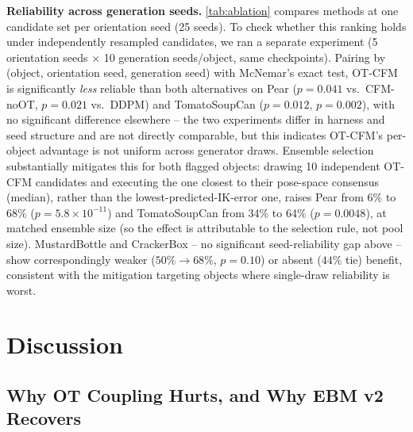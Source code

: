 \documentclass[journal]{IEEEtran}
\begin{document}
\noindent\textbf{Reliability across generation seeds.}
\cref{tab:ablation} compares methods at one candidate set per orientation
seed (25 seeds). To check whether this ranking holds under independently
resampled candidates, we ran a separate experiment (5 orientation seeds
$\times$ 10 generation seeds/object, same checkpoints). Pairing by (object,
orientation seed, generation seed) with McNemar's exact test, OT-CFM is
significantly \emph{less} reliable than both alternatives on Pear
($p{=}0.041$ vs.\ CFM-noOT, $p{=}0.021$ vs.\ DDPM) and TomatoSoupCan
($p{=}0.012$, $p{=}0.002$), with no significant difference elsewhere -- the
two experiments differ in harness and seed structure and are not directly
comparable, but this indicates OT-CFM's per-object advantage is not uniform
across generator draws. Ensemble selection substantially mitigates this for
both flagged objects: drawing 10 independent OT-CFM candidates and
executing the one closest to their pose-space consensus (median), rather
than the lowest-predicted-IK-error one, raises Pear from 6\% to 68\%
($p{=}5.8{\times}10^{-11}$) and TomatoSoupCan from 34\% to 64\%
($p{=}0.0048$), at matched ensemble size (so the effect is attributable to
the selection rule, not pool size). MustardBottle and CrackerBox -- no
significant seed-reliability gap above -- show correspondingly weaker
($50\%{\to}68\%$, $p{=}0.10$) or absent ($44\%$ tie) benefit, consistent
with the mitigation targeting objects where single-draw reliability is
worst.

\section{Discussion}
\label{sec:discussion}

\subsection{Why OT Coupling Hurts, and Why EBM v2 Recovers}
\label{sec:why-ot-hurts}
\end{document}
